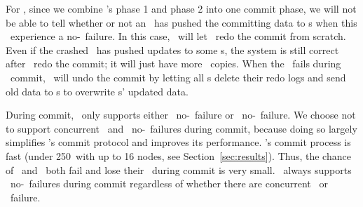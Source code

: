 For \mrsw, since we combine \mrmw's phase 1 and phase 2 into one commit phase,
we will not be able to tell whether or not an \on\ has pushed the committing data to \dn{}s 
when this \on\ experience a no-\nvm\ failure.
In this case, \hotpot\ will let \xn\ redo the commit from scratch. 
Even if the crashed \on\ has pushed updates to some \dn{}s,
the system is still correct after \xn\ redo the commit;
it will just have more \redundant\ copies.
When the \xn\ fails during \mrsw\ commit, \hotpot\ will undo the commit
by letting all \on{}s delete their redo logs and send old data to \dn{}s to overwrite \dn{}s' updated data.

During commit, \hotpot\ only supports either \xn\ no-\nvm\ failure or \on\ no-\nvm\ failure.
We choose not to support concurrent \xn\ and \on\ no-\nvm\ failures during commit,
because doing so largely simplifies \hotpot's commit protocol and improves its performance.
\hotpot's commit process is fast (under 250\mus\ with up to 16 nodes, see Section~\ref{sec:results}).
Thus, the chance of \xn\ and \on\ both fail and lose their \nvm\ during commit is very small.
\hotpot\ always supports \dn\ no-\nvm\ failures during commit regardless of whether there are concurrent \xn\ or \on\ failure.

